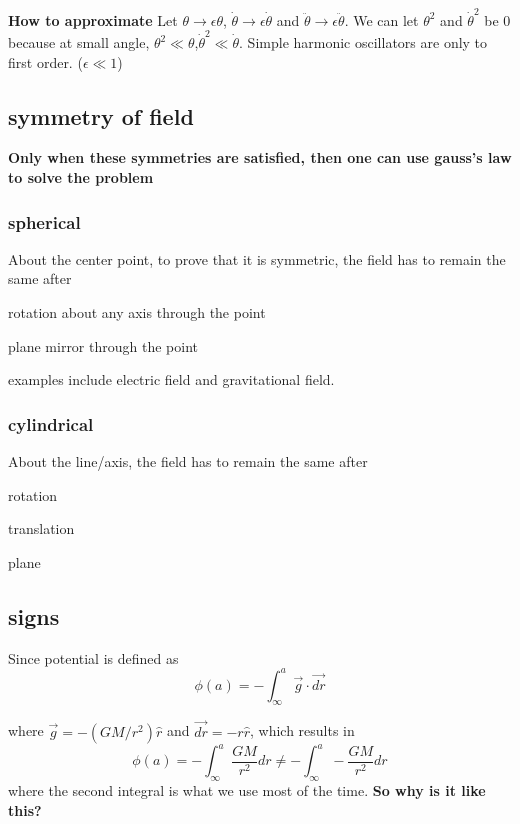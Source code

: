 \textbf{How to approximate} Let $\theta \to \epsilon \theta $, $\dot{\theta} \to \epsilon \dot{\theta}$ and $\ddot{\theta} \to \epsilon \ddot{\theta}$. We can let $\theta^2$ and $\dot{\theta}^2$ be 0 because at small angle, $\theta^2 \ll \theta$,$\dot{\theta}^2 \ll \dot{\theta}$. Simple harmonic oscillators are only to first order. ($\epsilon \ll 1$)

\subsection{symmetry of field}
\textbf{Only when these symmetries are satisfied, then one can use gauss's law to solve the problem}
\subsubsection{spherical}
About the center point, to prove that it is symmetric, the field has to remain the same after

\begin{compactitem}
    \item rotation about any axis through the point
    \item plane mirror through the point
\end{compactitem}

examples include electric field and gravitational field.

\subsubsection{cylindrical}
About the line/axis, the field has to remain the same after
\begin{compactitem}
    \item rotation
    \item translation
    \item plane
\end{compactitem}

\subsection{signs}
Since potential is defined as 
\begin{equation}
    \phi(a)=-\int_{\infty}^a \vec{g} \cdot \vec{dr}
\end{equation}

where $\vec{g}= -(GM/r^2)\hat{r}$ and $\vec{dr}=-r \hat{r}$, which results in 
$$\phi(a)=-\int_{\infty}^a \frac{GM}{r^2}dr \neq -\int_{\infty}^a -\frac{GM}{r^2}dr$$
where the second integral is what we use most of the time. \textbf{So why is it like this?}

